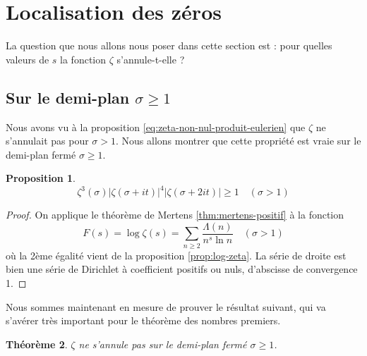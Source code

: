 \documentclass[french]{report}
\newtheorem{theorem}{Théorème}[section]
\newtheorem{proposition}[theorem]{Proposition}
\begin{document}
\section{Localisation des zéros}\label{section:localisation-zeros}

La question que nous allons nous poser dans cette section est : pour quelles valeurs de $s$ la fonction $\zeta$ s'annule-t-elle ?

\subsection{Sur le demi-plan $\sigma\geq 1$}

Nous avons vu à la proposition \ref{eq:zeta-non-nul-produit-eulerien} que $\zeta$ ne s'annulait pas pour $\sigma>1$. Nous allons montrer que cette propriété est vraie sur le demi-plan fermé $\sigma\geq1$.

\begin{proposition}\label{prop:zeta-inegalite-1}
  \[ \zeta^3(\sigma)|\zeta(\sigma+it)|^4|\zeta(\sigma+2it)|\geq1\quad(\sigma>1) \]  
\end{proposition}

\begin{proof}
  On applique le théorème de Mertens \ref{thm:mertens-positif} à la fonction
  \[ F(s) = \log\zeta(s) = \sum_{n\geq2}\frac{\Lambda(n)}{n^s\ln n}\quad(\sigma>1) \]
  où la 2ème égalité vient de la proposition \ref{prop:log-zeta}. La série de droite est bien une série de Dirichlet à coefficient positifs ou nuls, d'abscisse de convergence 1.
\end{proof}

Nous sommes maintenant en mesure de prouver le résultat suivant, qui va s'avérer très important pour le théorème des nombres premiers.

\begin{theorem}\label{eq:zeta-non-nul-demi-plan-ferme}
  $\zeta$ ne s'annule pas sur le demi-plan fermé $\sigma\geq1$.
\end{theorem}
\end{document}

